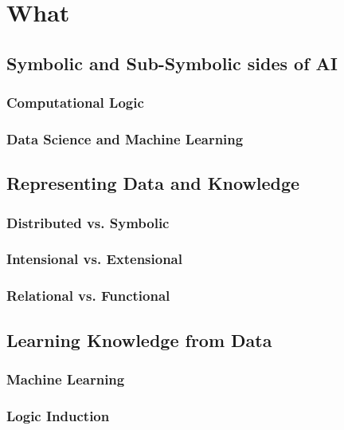 \documentclass[12pt,a4paper,openright,twoside]{book}
\begin{document}
\part{What}
\label{part:what}

\chapter{Symbolic and Sub-Symbolic sides of AI}

\section{Computational Logic}

\cite{cco-softwarex-2021-2pkt}
\cite{Korner2020HistoryFuturePrologTPLP}

\section{Data Science and Machine Learning}

\cite{xailp-woa2019}
\cite{xaisurvey-ia14}

\chapter{Representing Data and Knowledge}

\section{Distributed vs. Symbolic}

\section{Intensional vs. Extensional}

\section{Relational vs. Functional}

\chapter{Learning Knowledge from Data}

\section{Machine Learning}

\section{Logic Induction}
\end{document}
